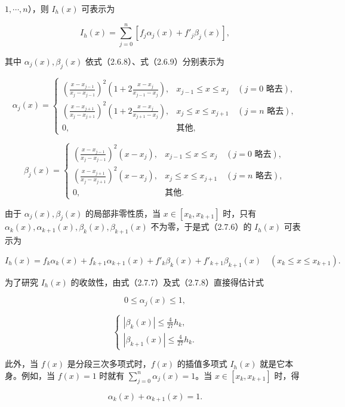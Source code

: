 \documentclass[
  10pt,
  fontset=fandol]{ctexart}
\begin{document}
\(1,\cdots,n\)），则 \(I_h(x)\) 可表示为

\[I_h(x)=\sum_{j=0}^n[f_j\alpha_j(x)+f'_j\beta_j(x)],\tag{2.7.6}\]

其中 \(\alpha_j(x),\beta_j(x)\) 依式（2.6.8）、式（2.6.9）分别表示为

\[\alpha_j(x)=\begin{cases}
\displaystyle\left(\frac{x-x_{j-1}}{x_j-x_{j-1}}\right)^2\left(1+2\frac{x-x_j}{x_{j-1}-x_j}\right),&x_{j-1}\leqslant x\leqslant x_j\quad(j=0\text{ 略去}),\\[6pt]
\displaystyle\left(\frac{x-x_{j+1}}{x_j-x_{j+1}}\right)^2\left(1+2\frac{x-x_j}{x_{j+1}-x_j}\right),&x_j\leqslant x\leqslant x_{j+1}\quad(j=n\text{ 略去}),\\[6pt]
0,&\text{其他},
\end{cases}\tag{2.7.7}\]

\[\beta_j(x)=\begin{cases}
\displaystyle\left(\frac{x-x_{j-1}}{x_j-x_{j-1}}\right)^2(x-x_j),&x_{j-1}\leqslant x\leqslant x_j\quad(j=0\text{ 略去}),\\[6pt]
\displaystyle\left(\frac{x-x_{j+1}}{x_j-x_{j+1}}\right)^2(x-x_j),&x_j\leqslant x\leqslant x_{j+1}\quad(j=n\text{ 略去}),\\[6pt]
0,&\text{其他}.
\end{cases}\tag{2.7.8}\]

由于 \(\alpha_j(x),\beta_j(x)\) 的局部非零性质，当 \(x\in[x_k,x_{k+1}]\) 时，只有 \(\alpha_k(x),\alpha_{k+1}(x),\beta_k(x),\beta_{k+1}(x)\) 不为零，于是式（2.7.6）的 \(I_h(x)\) 可表示为

\[I_h(x)=f_k\alpha_k(x)+f_{k+1}\alpha_{k+1}(x)+f'_k\beta_k(x)+f'_{k+1}\beta_{k+1}(x)\quad(x_k\leqslant x\leqslant x_{k+1}).\tag{2.7.9}\]

为了研究 \(I_h(x)\) 的收敛性，由式（2.7.7）及式（2.7.8）直接得估计式

\[0\leqslant\alpha_j(x)\leqslant1,\tag{2.7.10}\]

\[\begin{cases}
\displaystyle|\beta_k(x)|\leqslant\frac{4}{27}h_k,\\[6pt]
\displaystyle|\beta_{k+1}(x)|\leqslant\frac{4}{27}h_k.
\end{cases}\tag{2.7.11}\]

此外，当 \(f(x)\) 是分段三次多项式时，\(f(x)\) 的插值多项式 \(I_h(x)\) 就是它本身。例如，当 \(f(x)=1\) 时就有 \(\sum_{j=0}^n\alpha_j(x)=1\)。当 \(x\in[x_k,x_{k+1}]\) 时，得

\[\alpha_k(x)+\alpha_{k+1}(x)=1.\tag{2.7.12}\]
\end{document}
